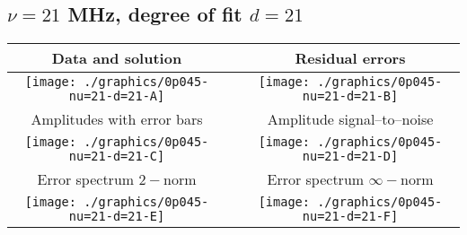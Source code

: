 

% 

\clearpage{}
\break{}

\subsection{$\nu = 21$ MHz, degree of fit $d = 21$}

\begin{table}[h]
    \begin{center}
        \begin{tabular}{ccc}
            Data and solution & \quad & Residual errors \\\hline
            \texttt{[image: ./graphics/0p045-nu=21-d=21-A]} &&
            \texttt{[image: ./graphics/0p045-nu=21-d=21-B]} \\[15pt]
            Amplitudes with error bars && Amplitude signal--to--noise \\\hline
            \texttt{[image: ./graphics/0p045-nu=21-d=21-C]} &&
            \texttt{[image: ./graphics/0p045-nu=21-d=21-D]} \\[15pt]
            Error spectrum $2-$norm && Error spectrum $\infty-$norm \\\hline
            \texttt{[image: ./graphics/0p045-nu=21-d=21-E]} &&
            \texttt{[image: ./graphics/0p045-nu=21-d=21-F]} \\[15pt]
        \end{tabular}
    \end{center}
\label{fig:elev=45, nu=21}
\end{table}



\endinput
